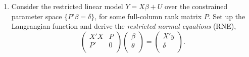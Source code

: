 \documentclass[11pt]{article}
\begin{document}
\begin{enumerate}
\item Consider the restricted linear model $Y = X\beta + U$ over the constrained parameter space $\{P'\beta = \delta\}$, for some full-column rank matrix $P$.  Set up the Langrangian function and derive the {\em restricted normal equations} (RNE),
\[
\begin{pmatrix}
X'X & P \\
P' & 0 \\
\end{pmatrix}
\begin{pmatrix}
\beta \\
\theta \\
\end{pmatrix} = 
\begin{pmatrix}
X'y \\
\delta \\
\end{pmatrix}.
\]

\end{enumerate}
\end{document}
